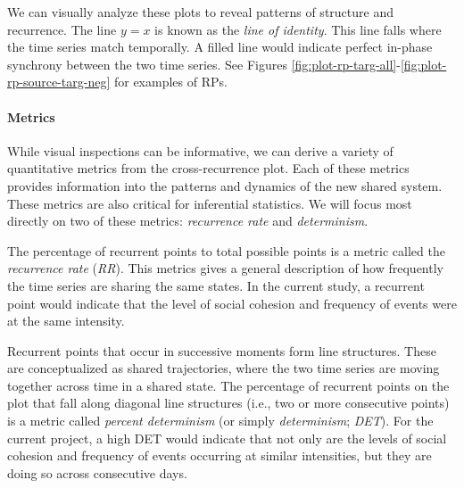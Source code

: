 \documentclass[english,man]{apa6}
\begin{document}
We can visually analyze these plots
to reveal patterns of structure and recurrence. The line \(y = x\) is known
as the \emph{line of identity}. This line falls where the time series match
temporally. A filled line would indicate perfect in-phase synchrony between the
two time series. See
Figures \ref{fig:plot-rp-targ-all}-\ref{fig:plot-rp-source-targ-neg}
for examples of RPs.

\hypertarget{metrics}{%
\paragraph{Metrics}\label{metrics}}

While visual inspections can be informative, we can derive a variety of
quantitative metrics from the cross-recurrence plot. Each of these metrics
provides information into the patterns and dynamics of the new shared system.
These metrics are also critical for inferential
statistics. We will focus most directly on two of these metrics:
\emph{recurrence rate} and \emph{determinism}.

The percentage of recurrent points to total possible points is a metric
called the \emph{recurrence rate} (\emph{RR}). This metrics gives a general description of
how frequently the time series are sharing the same states. In the current
study, a recurrent point would indicate that the level of social cohesion
and frequency of events were at the same intensity.

Recurrent points that occur in successive moments form line structures.
These are conceptualized as shared trajectories, where the two time series
are moving together across time in a shared state. The percentage of
recurrent points on the plot that fall along diagonal line structures
(i.e., two or more
consecutive points) is a metric called \emph{percent determinism}
(or simply \emph{determinism}; \emph{DET}). For the
current project, a high DET would indicate that not only are the levels of
social cohesion and frequency of events occurring at similar intensities,
but they are doing so across consecutive days.
\end{document}
